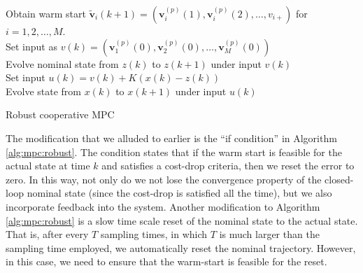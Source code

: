\begin{algorithm}
{{  Obtain warm start $\tilde{\mathbf{v}}_i(k+1) =
    (\mathbf{v}_i^{(p)}(1),\mathbf{v}_i^{(p)}(2),\ldots,v_{i+})$ for $i = 1,2,\ldots,M$.\\
   Set input as $v(k) =
  (\mathbf{v}_1^{(p)}(0),\mathbf{v}_2^{(p)}(0),\ldots,\mathbf{v}_M^{(p)}(0))$\\
  Evolve nominal state from $z(k)$ to $z(k+1)$ under input $v(k)$\\
  Set input $u(k) = v(k)+ K(x(k) - z(k))$\\
  Evolve state from $x(k)$ to $x(k+1)$ under input $u(k)$\\
 }
}
\caption{Robust cooperative MPC}
\label{alg:mpc:robust}
\end{algorithm}

The modification that we alluded to earlier is the ``if condition'' in
Algorithm \ref{alg:mpc:robust}. The condition states that if the warm start
is feasible for the actual state at time $k$ and satisfies a cost-drop
criteria, then we reset the error to zero. In this way, not only do we not
lose the convergence property of the closed-loop nominal state (since
the cost-drop is satisfied all the time), but we also incorporate
feedback into the system. Another modification to Algorithm
\ref{alg:mpc:robust} is a slow time scale reset of the nominal state to the
actual state. That is, after every $T$ sampling times, in which $T$ is
much larger than the sampling time employed, we automatically reset
the nominal trajectory. However, in this case, we need to ensure that
the warm-start is feasible for the reset. 

